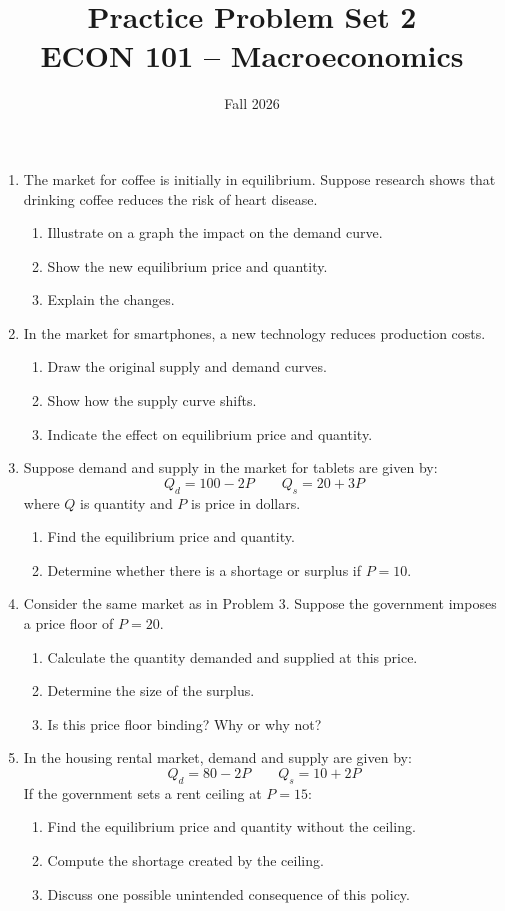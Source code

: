 \documentclass[12pt]{article}
\title{Practice Problem Set 2\\ \vspace{15pt} \large ECON 101 -- Macroeconomics}
\author{}
\date{Fall 2026}
\begin{document}
\maketitle


\begin{enumerate}



\item
The market for coffee is initially in equilibrium. Suppose research shows that drinking coffee reduces the risk of heart disease.
\begin{enumerate}
    \item Illustrate on a graph the impact on the demand curve.
    \item Show the new equilibrium price and quantity.
    \item Explain the changes.
\end{enumerate}

\item
In the market for smartphones, a new technology reduces production costs.
\begin{enumerate}
    \item Draw the original supply and demand curves.
    \item Show how the supply curve shifts.
    \item Indicate the effect on equilibrium price and quantity.
\end{enumerate}

\item
Suppose demand and supply in the market for tablets are given by:
\[
Q_d = 100 - 2P \quad \quad Q_s = 20 + 3P
\]
where \(Q\) is quantity and \(P\) is price in dollars.
\begin{enumerate}
    \item Find the equilibrium price and quantity.
    \item Determine whether there is a shortage or surplus if \(P = 10\).
\end{enumerate}

\item
Consider the same market as in Problem 3. Suppose the government imposes a price floor of \(P = 20\).
\begin{enumerate}
    \item Calculate the quantity demanded and supplied at this price.
    \item Determine the size of the surplus.
    \item Is this price floor binding? Why or why not?
\end{enumerate}
\newpage
\item
In the housing rental market, demand and supply are given by:
\[
Q_d = 80 - 2P \quad \quad Q_s = 10 + 2P
\]
If the government sets a rent ceiling at \(P = 15\):
\begin{enumerate}
    \item Find the equilibrium price and quantity without the ceiling.
    \item Compute the shortage created by the ceiling.
    \item Discuss one possible unintended consequence of this policy.
\end{enumerate}





\end{enumerate}
\end{document}
